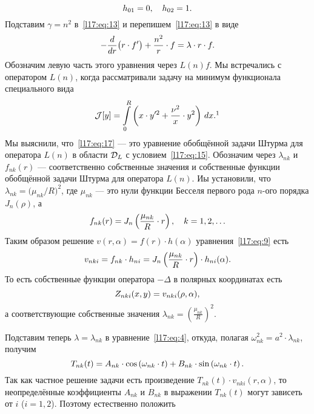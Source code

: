 \begin{equation*}
	\hfill h_{01}=0,\quad h_{02}=1.\hfill
\end{equation*}
Подставим $\gamma=n^2$ в~\eqref{l17:eq:13} и перепишем~\eqref{l17:eq:13} в виде
\begin{equation}\label{l17:eq:17}
	\hfill-\der{}{r}\big(r\cdot f'\big)+\frac{n^2}{r}\cdot f=\lambda\cdot r\cdot f.\hfill
\end{equation}
Обозначим левую часть этого уравнения через $L(n)f$. Мы встречались с оператором $L(n)$, когда рассматривали задачу на минимум функционала специального вида 
\begin{equation*}
	\hfill\J[y]=\int\limits_{0}^{R}\left(x\cdot y'^2+\frac{\nu^2}{x}\cdot y^2\right)\,dx.\footnotemark{}\hfill
\end{equation*}%
Мы выяснили, что~\eqref{l17:eq:17} --- это уравнение обобщённой задачи Штурма для оператора $L(n)$ в области $\mathcal{D}_{L}$ с условием~\eqref{l17:eq:15}. Обозначим через $\lambda_{nk}$ и $f_{nk}(r)$ --- соответственно собственные значения и собственные функции обобщённой задачи Штурма для оператора $L(n)$. Иы установили, что $\lambda_{nk}=\big(\mu_{nk}/R\big)^2$, где $\mu_{nk}$ --- это нули функции Бесселя первого рода $n$-ого порядка $J_n(\rho)$, а
\begin{equation*}
	\hfill f_{nk}(r)=J_n\left(\frac{\mu_{nk}}{R}\cdot r\right),\quad k=1,2,\ldots\hfill
\end{equation*}  
Таким образом решение $v(r,\alpha)=f(r)\cdot h(\alpha)$ уравнения~\eqref{l17:eq:9} есть
\begin{equation}\label{l17:eq:18}
	\hfill v_{nki}=f_{nk}\cdot h_{ni}=J_{n}\left(\frac{\mu_{nk}}{R}\cdot r\right)\cdot h_{ni}(\alpha).\hfill
\end{equation}
То есть собственные функции оператора $-\Delta$ в полярных координатах есть
\begin{equation*}
	\hfill Z_{nki}(x,y)=v_{nki}(\rho,\alpha),\hfill
\end{equation*}
а соответствующие собственные значения $\displaystyle\lambda_{nk}=\left(\frac{\mu_{nk}}{R}\right)^2$. 

Подставим теперь $\lambda=\lambda_{nk}$ в уравнение~\eqref{l17:eq:4}, откуда, полагая $\omega_{nk}^2=a^2\cdot\lambda_{nk}$, получим
\begin{equation*}
	\hfill T_{nk}(t)=A_{nk}\cdot\cos\left(\omega_{nk}\cdot t\right)+B_{nk}\cdot\sin\left(\omega_{nk}\cdot t\right).\hfill
\end{equation*}
Так как частное решение задачи есть произведение $T_{nk}(t)\cdot v_{nki}(r,\alpha)$, то неопределённые коэффициенты $A_{nk}$ и $B_{nk}$ в выражении $T_{nk}(t)$ могут зависеть от $i$ ($i=1,2$). Поэтому естественно положить 

